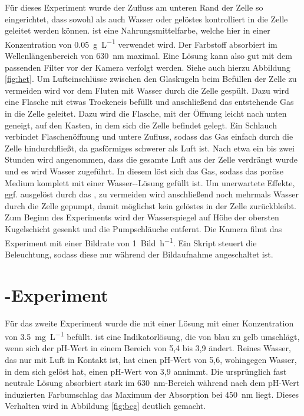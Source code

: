 Für dieses Experiment wurde der Zufluss am unteren Rand der Zelle so eingerichtet, dass sowohl \COT als auch Wasser oder gelöstes \BB kontrolliert in die Zelle geleitet werden können. \BB ist eine Nahrungsmittelfarbe, welche hier in einer Konzentration von \SI{0,05}{\gram\per\liter} verwendet wird. Der Farbstoff absorbiert im Wellenlängenbereich von \SI{630}{\nano\meter} maximal. Eine \BB Lösung kann also gut mit dem passenden Filter vor der Kamera verfolgt werden. Siehe auch hierzu Abbildung \ref{fig:het}.
Um Lufteinschlüsse zwischen den Glaskugeln beim Befüllen der Zelle zu vermeiden wird vor dem Fluten mit Wasser \COT durch die Zelle gespült. Dazu wird eine Flasche mit etwas Trockeneis befüllt und anschließend das entstehende Gas in die Zelle geleitet. Dazu wird die Flasche, mit der Öffnung leicht nach unten geneigt, auf den Kasten, in dem sich die Zelle befindet gelegt. Ein Schlauch verbindet Flaschenöffnung und untere Zufluss, sodass das Gas einfach durch die Zelle hindurchfließt, da gasförmiges \COT schwerer als Luft ist. Nach etwa ein bis zwei Stunden wird angenommen, dass die gesamte Luft aus der Zelle verdrängt wurde und es wird Wasser zugeführt. In diesem löst sich das Gas, sodass das poröse Medium komplett mit einer Wasser-\COT-Lösung gefüllt ist. Um unerwartete Effekte, ggf. ausgelöst durch das \COT, zu vermeiden wird anschließend noch mehrmals Wasser durch die Zelle gepumpt, damit möglichst kein gelöstes \COT in der Zelle zurückbleibt.
Zum Beginn des Experiments wird der Wasserspiegel auf Höhe der obersten Kugelschicht gesenkt und die Pumpschläuche entfernt.
Die Kamera filmt das Experiment mit einer Bildrate von \SI{1}{Bild\per\hour}. Ein Skript steuert die Beleuchtung, sodass diese nur während der Bildaufnahme angeschaltet ist.



\section{\COT-Experiment}
\label{sec:cot}
Für das zweite Experiment wurde die \HSCs mit einer \BCG Lösung mit einer Konzentration von \SI{3,5}{\milli\gram\per\liter} befüllt. 
\BCG ist eine Indikatorlösung, die von blau zu gelb umschlägt, wenn sich der pH-Wert in einem Bereich von 5,4 bis 3,9 ändert. Reines Wasser, das nur mit Luft in Kontakt ist, hat einen pH-Wert von 5,6, wohingegen Wasser, in dem sich \COT gelöst hat, einen pH-Wert von 3,9 annimmt. 
Die ursprünglich fast neutrale Lösung absorbiert stark im \SI{630}{\nano\meter}-Bereich während nach dem pH-Wert induzierten Farbumschlag das Maximum der Absorption bei \SI{450}{\nano\meter} liegt. Dieses Verhalten wird in Abbildung \ref{fig:bcg} deutlich gemacht.


